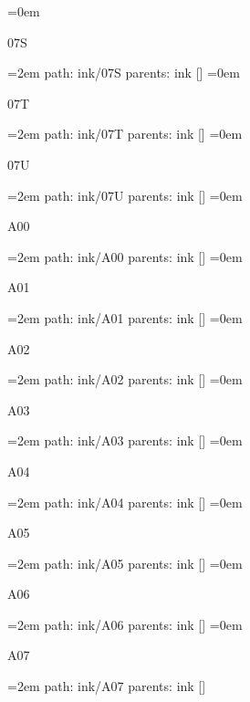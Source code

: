 \smallskip
\leftskip=0em
\par\endgroup
\bigskip
{}
07S
\smallskip
\par\begingroup
\leftskip=2em
path: ink/07S
\smallskip
parents:  ink []
\smallskip
\leftskip=0em
\par\endgroup
\bigskip
{}
07T
\smallskip
\par\begingroup
\leftskip=2em
path: ink/07T
\smallskip
parents:  ink []
\smallskip
\leftskip=0em
\par\endgroup
\bigskip
{}
07U
\smallskip
\par\begingroup
\leftskip=2em
path: ink/07U
\smallskip
parents:  ink []
\smallskip
\leftskip=0em
\par\endgroup
\bigskip
{}
A00
\smallskip
\par\begingroup
\leftskip=2em
path: ink/A00
\smallskip
parents:  ink []
\smallskip
\leftskip=0em
\par\endgroup
\bigskip
{}
A01
\smallskip
\par\begingroup
\leftskip=2em
path: ink/A01
\smallskip
parents:  ink []
\smallskip
\leftskip=0em
\par\endgroup
\bigskip
{}
A02
\smallskip
\par\begingroup
\leftskip=2em
path: ink/A02
\smallskip
parents:  ink []
\smallskip
\leftskip=0em
\par\endgroup
\bigskip
{}
A03
\smallskip
\par\begingroup
\leftskip=2em
path: ink/A03
\smallskip
parents:  ink []
\smallskip
\leftskip=0em
\par\endgroup
\bigskip
{}
A04
\smallskip
\par\begingroup
\leftskip=2em
path: ink/A04
\smallskip
parents:  ink []
\smallskip
\leftskip=0em
\par\endgroup
\bigskip
{}
A05
\smallskip
\par\begingroup
\leftskip=2em
path: ink/A05
\smallskip
parents:  ink []
\smallskip
\leftskip=0em
\par\endgroup
\bigskip
{}
A06
\smallskip
\par\begingroup
\leftskip=2em
path: ink/A06
\smallskip
parents:  ink []
\smallskip
\leftskip=0em
\par\endgroup
\bigskip
{}
A07
\smallskip
\par\begingroup
\leftskip=2em
path: ink/A07
\smallskip
parents:  ink []
